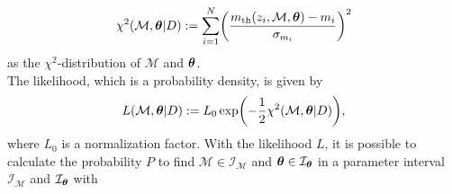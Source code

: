 \begin{align}
    \chi^2(\mathcal{M}, \vb*{\theta} \vert D) := \sum_{i=1}^{N} \biggl(\frac{m_{\text{th}}(z_{i}, \mathcal{M}, \vb*{\theta}) - m_{i}}{\sigma_{m_{i}}}\biggr)^2 \label{eq:chi-square} 
\end{align}
as the $\chi^2$-distribution of $\mathcal{M}$ and $\vb*{\theta}$. \\
\noindent The likelihood, which is a probability density, is given by 
\begin{align}
    L(\mathcal{M}, \vb*{\theta} \vert D) := L_{0} \exp \biggl(-\frac{1}{2} \chi^2(\mathcal{M}, \vb*{\theta} \vert D) \biggr),  \label{eq:likelihood}
\end{align}
where $L_{0}$ is a normalization factor.
With the likelihood $L$, it is possible to calculate the probability $P$ to find $\mathcal{M} \in \mathcal{I}_{\mathcal{M}}$ and $\vb*{\theta} \in \mathcal{I}_{\vb*{\theta}}$ in a parameter interval $\mathcal{I}_{\mathcal{M}}$ and $\mathcal{I}_{\vb*{\theta}}$ with 


